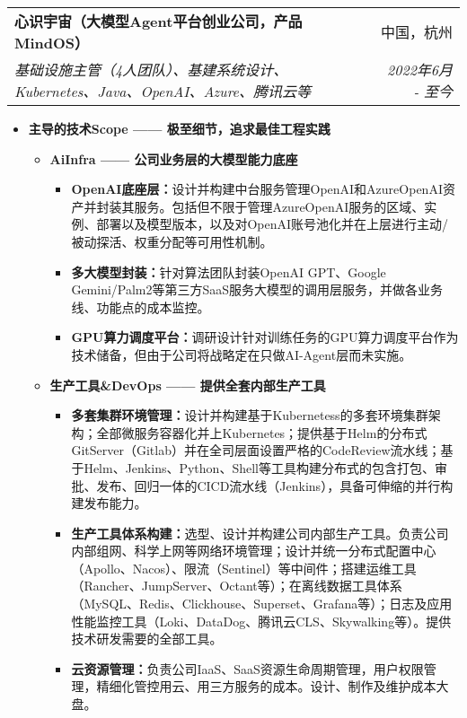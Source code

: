 \documentclass[letterpaper,11pt]{article}
\makeatletter
\newcommand{\resumeSubheading}[4]{
	\vspace{-1pt}\item
	\begin{tabular*}{0.97\textwidth}[t]{l@{\extracolsep{\fill}}r}
		\textbf{#1} & #2 \\
		\textit{\small#3} & \textit{\small #4} \\
	\end{tabular*}\vspace{-5pt}
}
\makeatother
\begin{document}
\begin{spacing}{1.0}
		\resumeSubheading
		{心识宇宙（大模型Agent平台创业公司，产品MindOS）}{中国，杭州}
		{基础设施主管（4人团队）、基建系统设计、Kubernetes、Java、OpenAI、Azure、腾讯云等}{2022年6月 - 至今}
		\begin{itemize}
			\item \textbf{主导的技术Scope —— 极至细节，追求最佳工程实践}
			\begin{itemize}
				\item \textbf{AiInfra —— 公司业务层的大模型能力底座}
				\begin{itemize}
					\item \textbf{OpenAI底座层：}设计并构建中台服务管理OpenAI和AzureOpenAI资产并封装其服务。包括但不限于管理AzureOpenAI服务的区域、实例、部署以及模型版本，以及对OpenAI账号池化并在上层进行主动/被动探活、权重分配等可用性机制。
					\item \textbf{多大模型封装：}针对算法团队封装OpenAI GPT、Google Gemini/Palm2等第三方SaaS服务大模型的调用层服务，并做各业务线、功能点的成本监控。
					\item \textbf{GPU算力调度平台：}调研设计针对训练任务的GPU算力调度平台作为技术储备，但由于公司将战略定在只做AI-Agent层而未实施。
				\end{itemize}
				
				\item \textbf{生产工具\&DevOps —— 提供全套内部生产工具}
				\begin{itemize}
					\item \textbf{多套集群环境管理：}设计并构建基于Kubernetess的多套环境集群架构；全部微服务容器化并上Kubernetes；提供基于Helm的分布式GitServer（Gitlab）并在全司层面设置严格的CodeReview流水线；基于Helm、Jenkins、Python、Shell等工具构建分布式的包含打包、审批、发布、回归一体的CICD流水线（Jenkins），具备可伸缩的并行构建发布能力。
					\item \textbf{生产工具体系构建：}选型、设计并构建公司内部生产工具。负责公司内部组网、科学上网等网络环境管理；设计并统一分布式配置中心（Apollo、Nacos）、限流（Sentinel）等中间件；搭建运维工具（Rancher、JumpServer、Octant等）；在离线数据工具体系（MySQL、Redis、Clickhouse、Superset、Grafana等）；日志及应用性能监控工具（Loki、DataDog、腾讯云CLS、Skywalking等）。提供技术研发需要的全部工具。
					\item \textbf{云资源管理：}负责公司IaaS、SaaS资源生命周期管理，用户权限管理，精细化管控用云、用三方服务的成本。设计、制作及维护成本大盘。
				\end{itemize}
				

\end{itemize}
\end{itemize}
\end{spacing}
\end{document}
